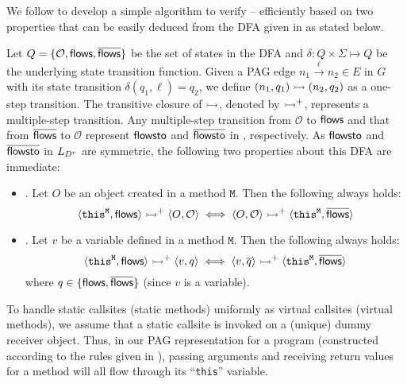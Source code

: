 We follow \cite{He2021Turner} to develop a simple algorithm to verify \selconOne -- \selconThree efficiently 
based on two properties that can be easily deduced from the DFA given in 
 as stated below.

Let $Q = \{\mathcal{O}, \textsf{flows}, \overline{\textsf{flows}}\}$ be the set of states in the DFA
and
$\delta: Q \times \Sigma \mapsto Q$  be the underlying 
state transition function. 
Given a PAG edge $n_1 \xrightarrow{\ell} n_2 \in E$ in $G$ with 
  its state transition $\delta(q_1, \ell) = q_2$, we define $(n_1, q_1) \rightarrowtail (n_2, q_2)$ 
as a one-step transition.  The transitive closure of $\rightarrowtail$, denoted by $\rightarrowtail^{+}$, represents a multiple-step transition. {Any multiple-step transition from $\mathcal{O}$ to $\textsf{flows}$ and that from $\overline{\textsf{flows}}$ 
  to $\mathcal{O}$ represent $\textsf{flowsto}$ and $\overline{\textsf{flowsto}}$
  in }, respectively. As $\textsf{flowsto}$ and $\overline{\textsf{flowsto}}$  in
$\mbox{${L}_{D^r}$}$ are symmetric, the following two properties about this DFA are immediate:
\begin{itemize}[leftmargin=*]
    \item \propo.
  Let $O$ be an object created in  a method $\mathtt{M}$. Then
  the following  always holds:
\begin{equation*}
{
    \csabstraction{\texttt{this}^\mathtt{M}}{\flows}  \transitivetran   \csabstraction{O}{\mathcal{O}}  \iff 
	\csabstraction{O}{\mathcal{O}}   \transitivetran  \csabstraction {\texttt{this}^\mathtt{M}}{\iflows}
}
\end{equation*}
   \item \propv.
Let $v$ be a variable defined in a method $\mathtt{M}$. Then the following
always holds:
\begin{equation*}
{
    \csabstraction{\texttt{this}^\mathtt{M}}{\flows}  \transitivetran  \csabstraction{v}{q}
   \iff  
	\csabstraction{v}{\overline{q}} \transitivetran
	\csabstraction{\texttt{this}^\mathtt{M}}{\iflows}
}
\end{equation*}
where $q \in \{\textsf{flows}, \overline{\textsf{flows}}\}$
	(since $v$ is a variable).
\end{itemize}

To handle static callsites (static methods) uniformly as virtual callsites (virtual methods), we assume that 
a
static callsite is invoked on a (unique) dummy receiver object. Thus, in our
PAG representation for a program (constructed according to the rules given in ), passing arguments and receiving return values
for a method 
will all flow through its ``\texttt{this}'' variable.

